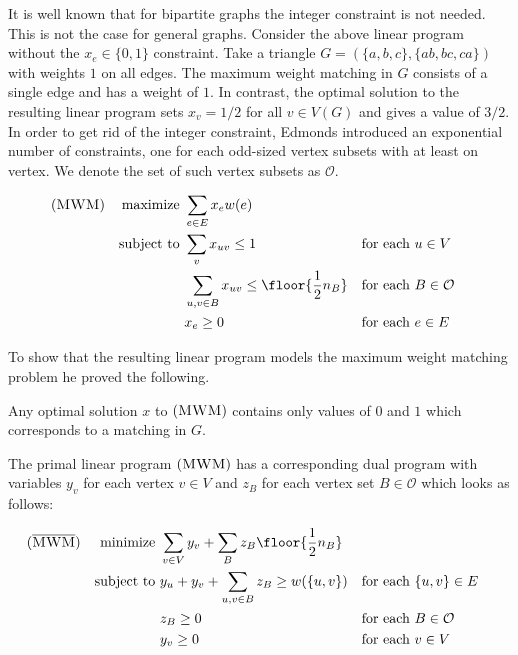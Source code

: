 It is well known that for bipartite graphs the integer constraint is not needed. This is not the case for general graphs. Consider the above linear program without the $x_e \in \{0,1\}$ constraint. Take a triangle $G = (\{a, b, c\}, \{ab, bc, ca\})$ with weights $1$ on all edges. The maximum weight matching in $G$ consists of a single edge and has a weight of $1$. In contrast, the optimal solution to the resulting linear program sets $x_v = 1/2$ for all $v \in V(G)$ and gives a value of $3/2$. In order to get rid of the integer constraint, Edmonds introduced an exponential number of constraints, one for each odd-sized vertex subsets with at least on vertex. We denote the set of such vertex subsets as $\mathcal{O}$.

\begin{align*}
(\textsc{MWM})
&&  \text{maximize }  & \sum_{e \in E} x_e w(e)\\
&& \text{subject to } & \sum_v x_{uv} \leq 1 &&\text{for each $u \in V$} \\
&&                    & \sum_{u, v \in B} x_{uv} \leq \floor{\frac{1}{2}n_B} &&\text{for each $B \in \mathcal{O}$} \\
&&                    & x_e \geq 0 &&\text{for each $e \in E$}
\end{align*}

To show that the resulting linear program models the maximum weight matching problem he proved the following.

\begin{theorem}
    Any optimal solution $x$ to $(\textsc{MWM})$ contains only values of $0$ and $1$ which corresponds to a matching in $G$.
\end{theorem}

The primal linear program $(\textsc{MWM})$ has a corresponding dual program with variables $y_v$ for each vertex $v \in V$ and $z_B$ for each vertex set $B \in \mathcal{O}$ which looks as follows:

\begin{align*}
(\overline{\textsc{MWM}})
&& \text{minimize }   & \sum_{v\in V}y_v + \sum_{B} z_B \floor{\frac{1}{2}n_B} \\
&& \text{subject to } & y_u + y_v + \sum_{u, v \in B} z_B \geq w(\{u, v\}) &&\text{for each $\{u, v\} \in E$} \\
&&                    & z_B \geq 0 &&\text{for each $B \in \mathcal{O}$} \\
&&                    & y_v \geq 0 &&\text{for each $v \in V$}
\end{align*}

